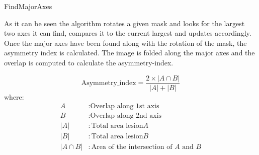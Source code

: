 \makeatletter
\def\BState{\State\hskip-\ALG@thistlm}
\makeatother
\begin{algorithm}[H]
\caption{FindMajorAxes}
\end{algorithm}

\noindent As it can be seen the algorithm rotates a given mask and looks for the largest two axes it can find, compares it to the current largest and updates accordingly. Once the major axes have been found along with the rotation of the mask, the asymmetry index is calculated. The image is folded along the major axes and the overlap is computed to calculate the asymmetry-index.

\[
\text{Asymmetry\_index} = \frac{2 \times |A \cap B|}{|A| + |B|}
\]
where:
\begin{align*}
A & : \text{Overlap along 1st axis} \\
B & : \text{Overlap along 2nd axis} \\
|A| & : \text{Total area lesion} A \\
|B| & : \text{Total area lesion} B \\
|A \cap B| & : \text{Area of the intersection of } A \text{ and } B
\end{align*}


